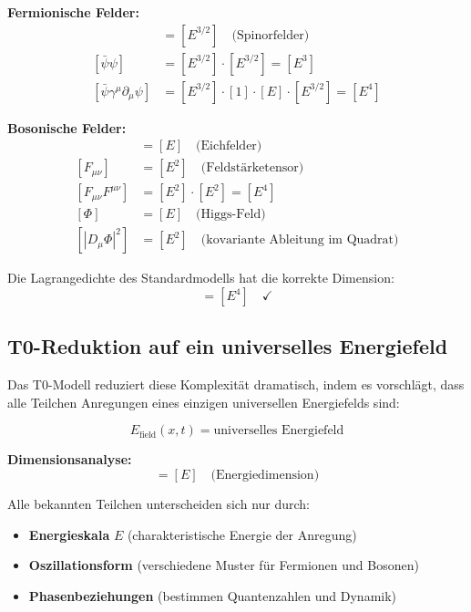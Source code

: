 \documentclass[12pt,a4paper]{report}
\begin{document}
	\textbf{Fermionische Felder:}
	\begin{align}
		[\psi_{\text{fermion}}] &= [E^{3/2}] \quad \text{(Spinorfelder)} \\
		[\bar{\psi}\psi] &= [E^{3/2}] \cdot [E^{3/2}] = [E^3] \\
		[\bar{\psi}\gamma^\mu\partial_\mu\psi] &= [E^{3/2}] \cdot [1] \cdot [E] \cdot [E^{3/2}] = [E^4]
	\end{align}
	
	\textbf{Bosonische Felder:}
	\begin{align}
		[A_\mu] &= [E] \quad \text{(Eichfelder)} \\
		[F_{\mu\nu}] &= [E^2] \quad \text{(Feldstärketensor)} \\
		[F_{\mu\nu}F^{\mu\nu}] &= [E^2] \cdot [E^2] = [E^4] \\
		[\Phi] &= [E] \quad \text{(Higgs-Feld)} \\
		[|D_\mu\Phi|^2] &= [E^2] \quad \text{(kovariante Ableitung im Quadrat)}
	\end{align}
	
	Die Lagrangedichte des Standardmodells hat die korrekte Dimension:
	\begin{equation}
		[\mathcal{L}_{\text{SM}}] = [E^4] \quad \checkmark
	\end{equation}
	
	\subsection{T0-Reduktion auf ein universelles Energiefeld}
	\label{subsec:t0_reduction}
	
	Das T0-Modell reduziert diese Komplexität dramatisch, indem es vorschlägt, dass alle Teilchen Anregungen eines einzigen universellen Energiefelds sind:
	
	\begin{equation}
		\boxed{E_{\text{field}}(x,t) = \text{universelles Energiefeld}}
		\label{eq:universal_energy_field}
	\end{equation}
	
	\textbf{Dimensionsanalyse:}
	\begin{equation}
		[E_{\text{field}}] = [E] \quad \text{(Energiedimension)}
	\end{equation}
	
	Alle bekannten Teilchen unterscheiden sich nur durch:
	\begin{itemize}
		\item \textbf{Energieskala} $E$ (charakteristische Energie der Anregung)
		\item \textbf{Oszillationsform} (verschiedene Muster für Fermionen und Bosonen)
		\item \textbf{Phasenbeziehungen} (bestimmen Quantenzahlen und Dynamik)
	\end{itemize}
	
\end{document}
